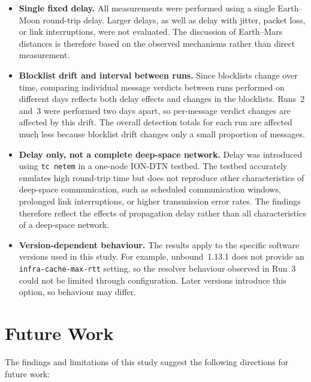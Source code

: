 \begin{itemize}

\item \textbf{Single fixed delay.} All measurements were performed using a single
Earth--Moon round-trip delay. Larger delays, as well as delay with jitter,
packet loss, or link interruptions, were not evaluated. The discussion of
Earth--Mars distances is therefore based on the observed mechanisms rather than
direct measurement.

\item \textbf{Blocklist drift and interval between runs.} Since blocklists change
over time, comparing individual message verdicts between runs performed on
different days reflects both delay effects and changes in the blocklists.
Runs~2 and~3 were performed two days apart, so per-message verdict changes are
affected by this drift. The overall detection totals for each run are affected
much less because blocklist drift changes only a small proportion of messages.

\item \textbf{Delay only, not a complete deep-space network.} Delay was introduced
using \texttt{tc netem} in a one-node ION-DTN testbed. The testbed accurately
emulates high round-trip time but does not reproduce other characteristics of
deep-space communication, such as scheduled communication windows, prolonged
link interruptions, or higher transmission error rates. The findings therefore
reflect the effects of propagation delay rather than all characteristics of a
deep-space network.

\item \textbf{Version-dependent behaviour.} The results apply to the specific
software versions used in this study. For example, unbound~1.13.1 does not
provide an \texttt{infra-cache-max-rtt} setting, so the resolver behaviour
observed in Run~3 could not be limited through configuration. Later versions
introduce this option, so behaviour may differ.
\end{itemize}


\section{Future Work}

The findings and limitations of this study suggest the following directions for future work:

